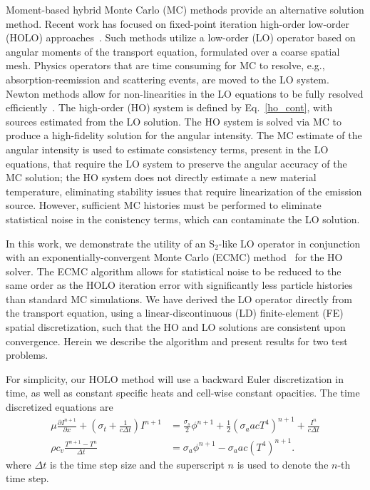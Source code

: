 \documentclass{mc2013}
\newcommand{\pderiv}[2]{\frac{\partial #1}{\partial #2}}
\begin{document}
Moment-based hybrid Monte Carlo (MC) methods provide an alternative solution
method.  Recent work has focused on fixed-point iteration high-order low-order (HOLO)
approaches~\cite{willert,park,rmc,ans_2014}.  Such methods utilize a low-order (LO)
operator based on angular moments of the transport equation, formulated over a coarse
spatial mesh. Physics operators that are time consuming for MC
to resolve, e.g., absorption-reemission and scattering events, are moved to the LO
system.  Newton methods allow for non-linearities in the LO equations to be fully
resolved efficiently~\cite{willert}.  The high-order (HO) system is defined by
Eq.~\eqref{ho_cont}, with sources estimated from the LO solution. The HO system is solved via MC to produce a high-fidelity solution for
the angular intensity.  The MC estimate of the angular intensity is used to estimate consistency terms,
present in the LO equations, that require the LO system to preserve the angular accuracy of the
MC solution; the HO system does not directly estimate a new material temperature,
eliminating stability issues that require linearization of the emission source.
However, sufficient MC histories must be performed to eliminate statistical
noise in the conistency terms, which can contaminate the LO solution.

In this work, we demonstrate the utility of an S$_2$-like LO operator in conjunction with an
exponentially-convergent Monte Carlo (ECMC) method~\cite{jake} for the HO solver.
The ECMC algorithm allows for statistical noise to be reduced to the same order as
the HOLO iteration error with significantly less particle histories than standard MC
simulations. We have derived the LO operator directly from the transport
equation, using a linear-discontinuous (LD) finite-element (FE) spatial
discretization, such that the HO and LO solutions are consistent upon convergence.
Herein we describe the algorithm and present results for two test problems.



For simplicity, our HOLO method will use a backward Euler discretization in time, as
well as constant specific heats and cell-wise constant opacities. The time discretized
equations are
\begin{align}
\mu \pderiv{I^{n+1}}{x} + \left(\sigma_t + \frac{1}{c \Delta t }\right) I^{n+1}
&= \frac{\sigma_s}{2} \phi^{n+1} +\frac{1}{2} \left(\sigma_a a c T^4 \right)^{n+1} +
\frac{I^n}{c \Delta t } \label{ho_trans} \\
\rho c_v \frac{T^{n+1} - T^n}{\Delta t} &= \sigma_a \phi^{n+1}
- \sigma_a a c (T^4)^{n+1} \label{lo_mat}.
\end{align}
where $\Delta t$ is the time step size and the superscript $n$ is used to denote
the $n$-th time step.  
\end{document}
